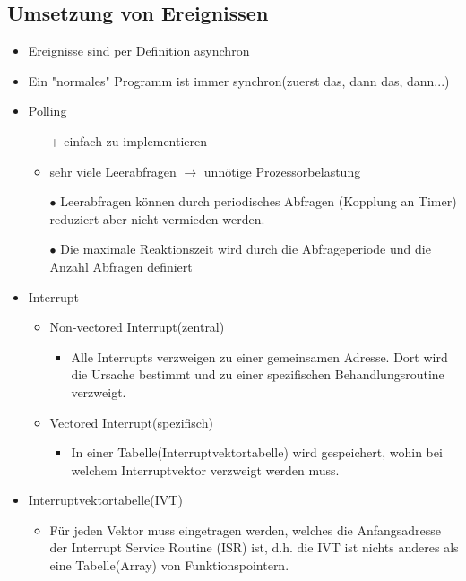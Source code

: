 \subsection{Umsetzung von Ereignissen}
\begin{itemize}
	\item Ereignisse sind per Definition asynchron
	\item Ein "normales" Programm ist immer synchron(zuerst das, dann das, dann...)
	\item Polling
	\begin{itemize}
		\item[+] einfach zu implementieren
		\item sehr viele Leerabfragen $\rightarrow$ unnötige Prozessorbelastung
		\item[$\bullet$] Leerabfragen können durch periodisches Abfragen (Kopplung an Timer) reduziert aber nicht vermieden werden.
		\item[$\bullet$] Die maximale Reaktionszeit wird durch die Abfrageperiode und die Anzahl Abfragen definiert
	\end{itemize}
	\item Interrupt
	\begin{itemize}
		\item Non-vectored Interrupt(zentral)
		\begin{itemize}
			\item Alle Interrupts verzweigen zu einer gemeinsamen Adresse. Dort wird die Ursache bestimmt und zu einer spezifischen Behandlungsroutine verzweigt.
		\end{itemize}
		\item Vectored Interrupt(spezifisch)
		\begin{itemize}
			\item In einer Tabelle(Interruptvektortabelle) wird gespeichert, wohin bei welchem Interruptvektor verzweigt werden muss.
		\end{itemize}
	\end{itemize}
	\item	Interruptvektortabelle(IVT)
	\begin{itemize}
		\item Für jeden Vektor muss eingetragen werden, welches die Anfangsadresse der Interrupt Service Routine (ISR) ist, d.h. die IVT ist nichts anderes als eine Tabelle(Array) von Funktionspointern.
	\end{itemize}
\end{itemize}
